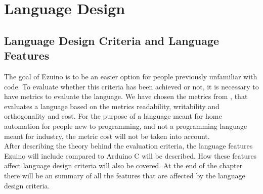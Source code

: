 \chapter{Language Design}\label{ch:langspec}
\section{Language Design Criteria and Language Features}
The goal of Ezuino is to be an easier option for people previously unfamiliar with code. To evaluate whether this criteria has been achieved or not, it is necessary to have metrics to evaluate the language. We have chosen the metrics from \cite{conceptsOfProgrammingLanguages}, that evaluates a language based on the metrics readability, writability and orthogonality and cost. For the purpose of a language meant for home automation for people new to programming, and not a programming language meant for industry, the metric cost will not be taken into account. \\
After describing the theory behind the evaluation criteria, the language features Ezuino will include compared to Arduino C will be described. How these features affect language design criteria will also be covered. At the end of the chapter there will be an summary of all the features that are affected by the language design criteria.